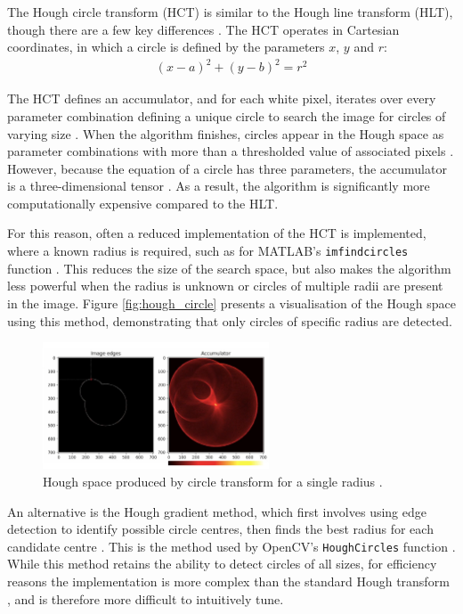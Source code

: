 The Hough circle transform (HCT) is similar to the Hough line transform (HLT), though there are a few key differences \cite{opencv_hct}. The HCT operates in Cartesian coordinates, in which a circle is defined by the parameters $x$, $y$ and $r$:
\begin{align}
  (x - a)^2 + (y - b)^2 = r^2
\end{align}

The HCT defines an accumulator, and for each white pixel, iterates over every parameter combination defining a unique circle to search the image for circles of varying size \cite{korting_hct}. When the algorithm finishes, circles appear in the Hough space as parameter combinations with more than a thresholded value of associated pixels \cite{korting_hct}. However, because the equation of a circle has three parameters, the accumulator is a three-dimensional tensor \cite{wikipedia_hct}. As a result, the algorithm is significantly more computationally expensive compared to the HLT.

For this reason, often a reduced implementation of the HCT is implemented, where a known radius is required, such as for MATLAB's \texttt{imfindcircles} function \cite{mathworks_imfindcircles}. This reduces the size of the search space, but also makes the algorithm less powerful when the radius is unknown or circles of multiple radii are present in the image. Figure \ref{fig:hough_circle} presents a visualisation of the Hough space using this method, demonstrating that only circles of specific radius are detected.

\begin{figure}[ht]
  \centering
  \includegraphics[width=0.6\textwidth]{images/hough_circle.png}
  \caption{Hough space produced by circle transform for a single radius \cite{korting_hct}.}
  \label{ref:hough_circle}
\end{figure}

An alternative is the Hough gradient method, which first involves using edge detection to identify possible circle centres, then finds the best radius for each candidate centre \cite{opencv_hct}. This is the method used by OpenCV's \texttt{HoughCircles} function \cite{opencv_hct}. While this method retains the ability to detect circles of all sizes, for efficiency reasons the implementation is more complex than the standard Hough transform \cite{opencv_hct}, and is therefore more difficult to intuitively tune.

